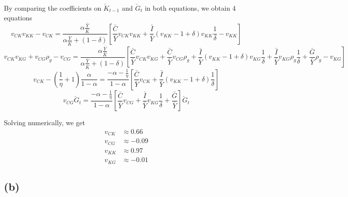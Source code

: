 \documentclass[11pt]{amsart}
\begin{document}
	By comparing the coefficients on $\check{K}_{t-1}$ and $\check{G}_t$ in both equations, we obtain 4 equations
	\begin{dmath*}
		v_{CK} v_{KK} - v_{CK} = \frac{\alpha \frac{\bar{Y}}{\bar{K}}}{\alpha \frac{\bar{Y}}{\bar{K}} + (1-\delta)} \left[ \frac{\bar{C}}{\bar{Y}} v_{CK} v_{KK} + \frac{\bar{I}}{\bar{Y}} (v_{KK} - 1 + \delta) v_{KK} \frac{1}{\delta} - v_{KK} \right]
	\end{dmath*}
	\begin{dmath*}
		v_{CK} v_{KG} + v_{CG}\rho_g - v_{CG} = \frac{\alpha \frac{\bar{Y}}{\bar{K}}}{\alpha \frac{\bar{Y}}{\bar{K}} + (1-\delta)} \left[ \frac{\bar{C}}{\bar{Y}} v_{CK} v_{KG} + \frac{\bar{C}}{\bar{Y}} v_{CG} \rho_g + \frac{\bar{I}}{\bar{Y}} (v_{KK} - 1 + \delta) v_{KG} \frac{1}{\delta} + \frac{\bar{I}}{\bar{Y}} v_{KG} \rho_g \frac{1}{\delta} + \frac{\bar{G}}{\bar{Y}} \rho_g - v_{KG} \right]
	\end{dmath*}
	\begin{dmath*}
		v_{CK} - \left( \frac{1}{\eta} + 1 \right) \frac{\alpha}{1-\alpha} = \frac{-\alpha - \frac{1}{\eta}}{1-\alpha} \left[ \frac{\bar{C}}{\bar{Y}} v_{CK} + \frac{\bar{I}}{\bar{Y}} (v_{KK} - 1 + \delta) \frac{1}{\delta} \right]
	\end{dmath*}
	\begin{dmath*}
		v_{CG} \check{G}_t = \frac{-\alpha - \frac{1}{\eta}}{1-\alpha} \left[ \frac{\bar{C}}{\bar{Y}} v_{CG} + \frac{\bar{I}}{\bar{Y}} v_{KG} \frac{1}{\delta} + \frac{\bar{G}}{\bar{Y}} \right] \check{G}_{t}
	\end{dmath*}
	
	Solving numerically, we get
	\begin{align*}
	v_{CK} &\approx 0.66 \\
	v_{CG} &\approx -0.09 \\
	v_{KK} &\approx 0.97 \\
	v_{KG} &\approx -0.01 
	\end{align*}

\subsection*{(b)}
	
\end{document}
